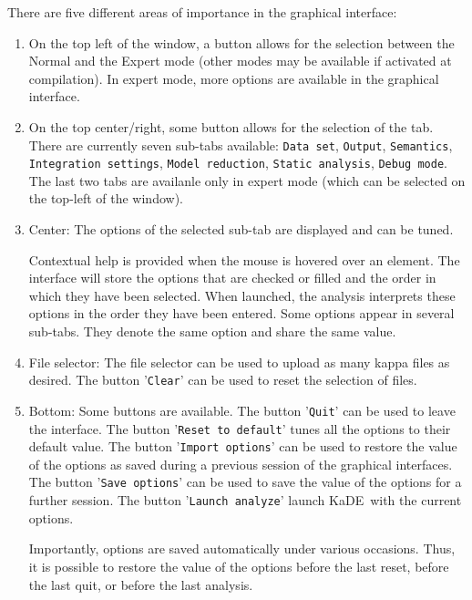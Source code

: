 \documentclass[11pt]{book}
\def\KaDE{\textsf{KaDE}}
\begin{document}
There are five different areas of importance in the graphical interface:
\begin{enumerate}
\item On the top left of the window, a button allows for the selection between the Normal and the Expert mode (other modes may be available if activated at compilation).
In expert mode, more options are available in the graphical interface.
\item On the top center/right, some button allows for the selection of the tab. There are currently seven sub-tabs available: \texttt{Data set}, \texttt{Output}, \texttt{Semantics}, \texttt{Integration settings}, \texttt{Model reduction}, \texttt{Static analysis}, \texttt{Debug mode}. The last two tabs are availanle only in expert mode (which can be selected on the top-left of the window).

\item Center: The options of the selected sub-tab are displayed and can be tuned.

Contextual help is provided when the mouse is hovered over an element.
The interface will store the options that are checked or filled and the order in which they have been selected.
When launched, the analysis interprets these options in the order they have been entered.
Some options appear in several sub-tabs. They denote the same option and share the same value.

\item File selector: The file selector can be used to upload as many kappa files as desired. The button '\texttt{Clear}' can be used to reset the selection of files.
\item Bottom: Some buttons are available. The button '\texttt{Quit}' can be used to leave the interface. The button '\texttt{Reset to default}' tunes all the options to their default value. The button '\texttt{Import options}' can be used to restore the value of the options as saved during a previous session of the graphical interfaces. The button '\texttt{Save options}' can be used to save the value of the options for a further session. The button '\texttt{Launch analyze}' launch \KaDE\ with the current options.

Importantly, options are saved automatically under various occasions. Thus, it is possible to restore the value of the options
before the last reset, before the last quit, or before the last analysis.
\end{enumerate}
\end{document}
